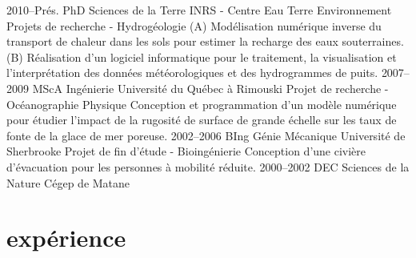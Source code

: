\documentclass[print]{friggos-cv} %
\begin{document}
\begin{entrylist}
\entryMod
{2010--Prés.}
{PhD {\normalfont Sciences de la Terre}}
{INRS - Centre Eau Terre Environnement}
{Projets de recherche - Hydrogéologie}
{(A) Modélisation numérique inverse du transport de chaleur dans les sols pour estimer la recharge des eaux souterraines. (B) Réalisation d'un logiciel informatique pour le traitement, la visualisation et l'interprétation des données météorologiques et des hydrogrammes de puits.}
\entryMod
{2007--2009}
{MScA {\normalfont Ingénierie}}
{Université du Québec à Rimouski}
{Projet de recherche - Océanographie Physique}
{Conception et programmation d'un modèle numérique pour étudier l'impact de la rugosité de surface de grande échelle sur les taux de fonte de la glace de mer poreuse.}
\entryMod
{2002--2006}
{BIng {\normalfont Génie Mécanique}}
{Université de Sherbrooke}
{Projet de fin d'étude - Bioingénierie}
{Conception d'une civière d'évacuation pour les personnes à mobilité réduite.}
\entryAlt
{2000--2002}
{DEC {\normalfont Sciences de la Nature}}
{Cégep de Matane}
\end{entrylist}


\section{expérience}
\end{document}
